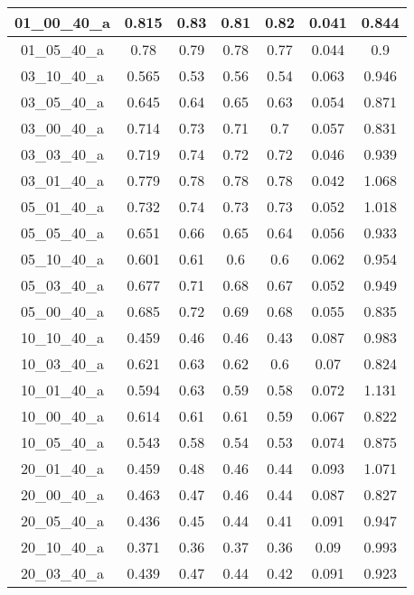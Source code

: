 \begin{table}[H]
{\begin{tabular}{|c|c|c|c|c|c|c|}
01\_00\_40\_a 	& 0.815 	& 0.83 	& 0.81 	& 0.82 	& 0.041 	& 0.844 	 \\ \hline
01\_05\_40\_a 	& 0.78 	& 0.79 	& 0.78 	& 0.77 	& 0.044 	& 0.9 	 \\ \hline
03\_10\_40\_a 	& 0.565 	& 0.53 	& 0.56 	& 0.54 	& 0.063 	& 0.946 	 \\ \hline
03\_05\_40\_a 	& 0.645 	& 0.64 	& 0.65 	& 0.63 	& 0.054 	& 0.871 	 \\ \hline
03\_00\_40\_a 	& 0.714 	& 0.73 	& 0.71 	& 0.7 	& 0.057 	& 0.831 	 \\ \hline
03\_03\_40\_a 	& 0.719 	& 0.74 	& 0.72 	& 0.72 	& 0.046 	& 0.939 	 \\ \hline
03\_01\_40\_a 	& 0.779 	& 0.78 	& 0.78 	& 0.78 	& 0.042 	& 1.068 	 \\ \hline
05\_01\_40\_a	& 0.732 	& 0.74 	& 0.73 	& 0.73 	& 0.052 	& 1.018 	 \\ \hline
05\_05\_40\_a 	& 0.651 	& 0.66 	& 0.65 	& 0.64 	& 0.056 	& 0.933 	 \\ \hline
05\_10\_40\_a 	& 0.601 	& 0.61 	& 0.6 	& 0.6 	& 0.062 	& 0.954 	 \\ \hline
05\_03\_40\_a 	& 0.677 	& 0.71 	& 0.68 	& 0.67 	& 0.052 	& 0.949 	 \\ \hline
05\_00\_40\_a 	& 0.685 	& 0.72 	& 0.69 	& 0.68 	& 0.055 	& 0.835 	 \\ \hline
10\_10\_40\_a 	& 0.459 	& 0.46 	& 0.46 	& 0.43 	& 0.087 	& 0.983 	 \\ \hline
10\_03\_40\_a	& 0.621 	& 0.63 	& 0.62 	& 0.6 	& 0.07 	& 0.824 	 \\ \hline
10\_01\_40\_a 	& 0.594 	& 0.63 	& 0.59 	& 0.58 	& 0.072 	& 1.131 	 \\ \hline
10\_00\_40\_a 	& 0.614 	& 0.61 	& 0.61 	& 0.59 	& 0.067 	& 0.822 	 \\ \hline
10\_05\_40\_a 	& 0.543 	& 0.58 	& 0.54 	& 0.53 	& 0.074 	& 0.875 	 \\ \hline
20\_01\_40\_a 	& 0.459 	& 0.48 	& 0.46 	& 0.44 	& 0.093 	& 1.071 	 \\ \hline
20\_00\_40\_a 	& 0.463 	& 0.47 	& 0.46 	& 0.44 	& 0.087 	& 0.827 	 \\ \hline
20\_05\_40\_a 	& 0.436 	& 0.45 	& 0.44 	& 0.41 	& 0.091 	& 0.947 	 \\ \hline
20\_10\_40\_a 	& 0.371 	& 0.36 	& 0.37 	& 0.36 	& 0.09 	& 0.993 	 \\ \hline
20\_03\_40\_a	& 0.439 	& 0.47 	& 0.44 	& 0.42 	& 0.091 	& 0.923 	 \\ \hline
\end{tabular}
}
\end{table}

